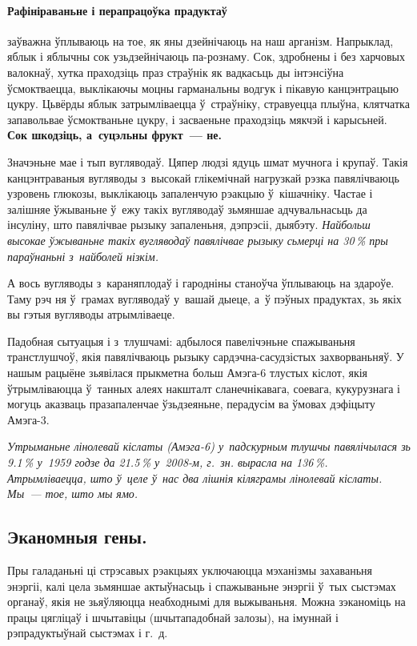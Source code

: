 \paragraph{Рафініраваньне і перапрацоўка прадуктаў} заўважна ўплываюць на тое, як яны дзейнічаюць на наш арганізм. Напрыклад, яблык і яблычны сок узьдзейнічаюць па-рознаму. Сок, здробнены і без харчовых валокнаў, хутка праходзіць праз страўнік як вадкасьць ды інтэнсіўна ўсмоктваецца, выклікаючы моцны гарманальны водгук і пікавую канцэнтрацыю цукру. Цьвёрды яблык затрымліваецца ў~страўніку, стравуецца плыўна, клятчатка запавольвае ўсмоктваньне цукру, і засваеньне праходзіць мякчэй і карысьней. \textbf{Сок шкодзіць, а~суцэльны фрукт~--- не.}

Значэньне мае і тып вугляводаў. Цяпер людзі ядуць шмат мучнога і крупаў. Такія канцэнтраваныя вугляводы з~высокай глікемічнай нагрузкай рэзка павялічваюць узровень глюкозы, выклікаюць запаленчую рэакцыю ў~кішачніку. Частае і залішняе ўжываньне ў~ежу такіх вугляводаў зьмяншае адчувальнасьць да інсуліну, што павялічвае рызыку запаленьня, дэпрэсіі, дыябэту. \emph{Найбольш высокае ўжываньне такіх вугляводаў павялічвае рызыку сьмерці на 30\,\% пры параўнаньні з~найболей нізкім.}

А вось вугляводы з~караняплодаў і гародніны станоўча ўплываюць на здароўе. Таму рэч ня ў~грамах вугляводаў у~вашай дыеце, а~ў пэўных прадуктах, зь якіх вы гэтыя вугляводы атрымліваеце.

Падобная сытуацыя і з~тлушчамі: адбылося павелічэньне спажываньня транстлушчоў, якія павялічваюць рызыку сардэчна-сасудзістых захворваньняў. У нашым рацыёне зьявілася прыкметна больш Амэга-6 тлустых кіслот, якія ўтрымліваюцца ў~танных алеях накшталт сланечнікавага, соевага, кукурузнага і могуць аказваць празапаленчае ўзьдзеяньне, перадусім ва ўмовах дэфіцыту Амэга-3. 

\emph{Утрыманьне лінолевай кіслаты (Амэга-6) у~падскурным тлушчы павялічылася зь 9.1\,\% у~1959 годзе да 21.5\,\% у~2008-м, г.~зн. вырасла на 136\,\%. Атрымліваецца, што ў~целе ў~нас два лішнія кіляграмы лінолевай кіслаты. Мы~--- тое, што мы ямо.}

\subsection*{Эканомныя гены.}

Пры галаданьні ці стрэсавых рэакцыях уключаюцца мэханізмы захаваньня энэргіі, калі цела зьмяншае актыўнасьць і спажываньне энэргіі ў~тых сыстэмах органаў, якія не зьяўляюцца неабходнымі для выжываньня. Можна зэканоміць на працы цягліцаў і шчытавіцы (шчытападобнай залозы), на імуннай і рэпрадуктыўнай сыстэмах і г.~д.

